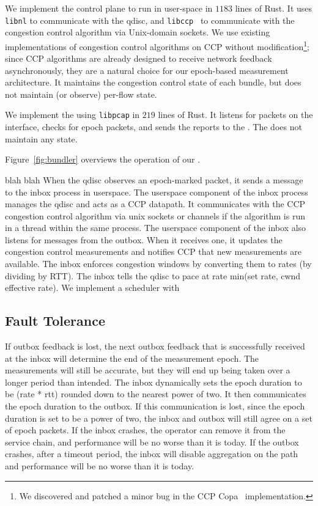 We implement the \inbox control plane to run in user-space in $1183$ lines of Rust. 
It uses \texttt{libnl} to communicate with the qdisc, and \texttt{libccp}~\cite{ccp} to communicate with the congestion control algorithm via Unix-domain sockets.
We use existing implementations of congestion control algorithms on CCP without modification\footnote{We discovered and patched a minor bug in the CCP Copa~\cite{copa} implementation.}; since CCP algorithms are already designed to receive network feedback asynchronously, they are a natural choice for our epoch-based measurement architecture.
It maintains the congestion control state of each bundle, but does not maintain (or observe) per-flow state.

We implement the \outbox using \texttt{libpcap} in $219$ lines of Rust. It listens for packets on the interface, checks for epoch packets, and sends the reports to the \inbox. 
The \outbox does not maintain any state.

Figure~\ref{fig:bundler} overviews the operation of our \name.

\begin{outline}
\1 blah
    \2 blah
        \3 When the qdisc observes an epoch-marked packet, it sends a message to the inbox process in userspace.
        \3 The userspace component of the inbox process manages the qdisc and acts as a CCP datapath. It communicates with the CCP congestion control algorithm via unix sockets or channels if the algorithm is run in a thread within the same process.
        \3 The userspace component of the inbox also listens for messages from the outbox. When it receives one, it updates the congestion control measurements and notifies CCP that new measurements are available.
        \3 The inbox enforces congestion windows by converting them to rates (by dividing by RTT). The inbox tells the qdisc to pace at rate min(set rate, cwnd effective rate).
    \2 We implement a scheduler with 
\end{outline}

\subsection{Fault Tolerance}\label{s:impl:ft}
\begin{outline}
\1 If outbox feedback is lost, the next outbox feedback that is successfully received at the inbox will determine the end of the measurement epoch.
    \2 The measurements will still be accurate, but they will end up being taken over a longer period than intended.
\1 The inbox dynamically sets the epoch duration to be (rate * rtt) rounded down to the nearest power of two. It then communicates the epoch duration to the outbox.
    \2 If this communication is lost, since the epoch duration is set to be a power of two, the inbox and outbox will still agree on a set of epoch packets.
\1 If the inbox crashes, the operator can remove it from the service chain, and performance will be no worse than it is today.
\1 If the outbox crashes, after a timeout period, the inbox will disable aggregation on the path and performance will be no worse than it is today.
\end{outline}

